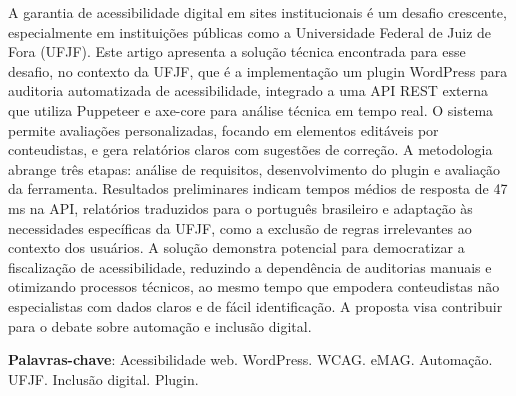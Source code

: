 \documentclass[
	article,			%
	12pt,				%
	oneside,			%
	a4paper,			%
	section=TITLE,		%
	subsection=TITLE,	%
	english,			%
	brazil,				%
	sumario=tradicional
	]{abntex2}
\begin{document}

\frenchspacing


%
%

\maketitle





\begin{resumoumacoluna}
    A garantia de acessibilidade digital em sites institucionais é um desafio
    crescente, especialmente em instituições públicas como a Universidade Federal
    de Juiz de Fora (UFJF). Este artigo apresenta a solução
    técnica encontrada para esse desafio, no contexto da UFJF, que é a
    implementação um plugin WordPress para auditoria automatizada de acessibilidade,
    integrado a uma API REST externa que utiliza Puppeteer e axe-core para análise
    técnica em tempo real. O sistema permite avaliações personalizadas, focando em
    elementos editáveis por conteudistas, e gera relatórios claros com sugestões de
    correção. A metodologia abrange três etapas: análise de requisitos,
    desenvolvimento do plugin e avaliação da ferramenta. Resultados preliminares
    indicam tempos médios de resposta de 47 ms na API, relatórios traduzidos para o
    português brasileiro e adaptação às necessidades específicas da UFJF, como a
    exclusão de regras irrelevantes ao contexto dos usuários. A solução demonstra
    potencial para democratizar a fiscalização de acessibilidade, reduzindo a
    dependência de auditorias manuais e otimizando processos técnicos, ao mesmo tempo
    que empodera conteudistas não especialistas com dados claros e de fácil
    identificação. A proposta visa contribuir para o debate sobre automação e
    inclusão digital.

    \vspace{\onelineskip}

    \noindent
    \textbf{Palavras-chave}: Acessibilidade web. WordPress. WCAG. eMAG. Automação. UFJF. Inclusão digital. Plugin.
    \vspace{\onelineskip}
\end{resumoumacoluna}
\end{document}
